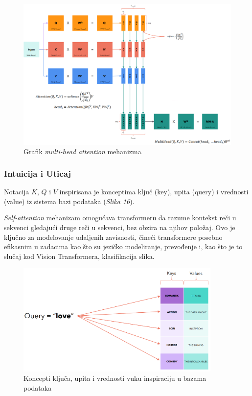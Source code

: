 \documentclass[12pt]{article}
\begin{document}
   \newpage
   \begin{figure}[h!]
      \hspace{-2cm} %
      \vspace{-0.5cm} %
      \includegraphics[width=1.3\textwidth]{mha.png}
      \caption{Grafik \textit{multi-head attention} mehanizma \cite{transformer}}
      \label{fig:mha}
   \end{figure}

   \subsubsection*{Intuicija i Uticaj}

   Notacija $K$, $Q$ i $V$ inspirisana je konceptima ključ (key), upita (query) i 
   vrednosti (value) iz sistema bazi podataka (\textit{Slika 16}).

   \textit{Self-attention} mehanizam omogućava transformeru da razume kontekst reči u sekvenci 
   gledajući druge reči u sekvenci, bez obzira na njihov položaj. 
   Ovo je ključno za modelovanje udaljenih zavisnosti, čineći transformere posebno efikasnim u 
   zadacima kao što su jezičko modeliranje, prevođenje i, kao što je to slučaj kod 
   Vision Transformera, klasifikacija slika.

   \newpage
   \begin{figure}[h!]
      \centering
      \vspace{-1cm} %
      \includegraphics[width=0.9\textwidth]{dict.png}
      \caption{Koncepti ključa, upita i vrednosti vuku inspiraciju u bazama podataka \cite{transformer}}
      \label{fig:mha}
   \end{figure}
\end{document}
